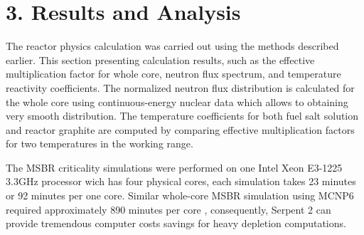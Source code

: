 \documentclass{anstrans}
\begin{document}
\section{3. Results and Analysis}
The reactor physics calculation was carried out using the methods described earlier. This section presenting calculation results, such as the effective multiplication factor for whole core, neutron flux spectrum, and temperature reactivity coefficients. The normalized neutron flux distribution is calculated for the whole core using continuous-energy nuclear data which allows to obtaining very smooth distribution. The temperature coefficients for both fuel salt solution and reactor graphite are computed by comparing effective multiplication factors for two temperatures in the working range.

The MSBR criticality simulations were performed on one Intel Xeon E3-1225 3.3GHz processor wich has four physical cores, each simulation takes 23 minutes or 92 minutes per one core. Similar whole-core MSBR simulation using MCNP6 required approximately 890 minutes per core \cite{park_whole_2015}, consequently, Serpent 2 can provide tremendous computer costs savings for heavy depletion computations.
\end{document}
